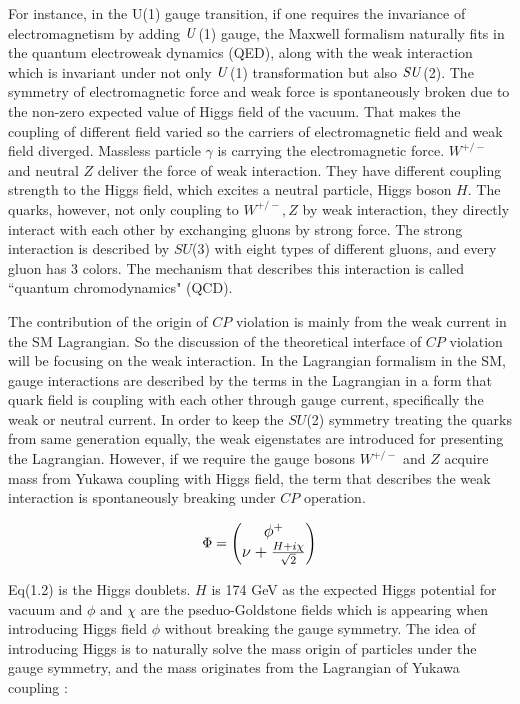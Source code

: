 For instance, in the U(1) gauge transition, if one requires the invariance of electromagnetism by adding $\it{U}$(1) gauge, the Maxwell formalism naturally fits in the quantum electroweak dynamics (QED), along with the weak interaction which is invariant under not only $\it{U}$(1) transformation but also $\it{SU}$(2). The symmetry of electromagnetic force and weak force is spontaneously broken due to the non-zero expected value of Higgs field of the vacuum. That makes the coupling of different field varied so the carriers of electromagnetic field and weak field diverged. Massless particle $\gamma$ is carrying the electromagnetic force. $W^{+/-}$ and neutral $Z$ deliver the force of weak interaction. They have different coupling strength to the Higgs field, which excites a neutral particle, Higgs boson $H$. The quarks, however, not only coupling to $W^{+/-},Z$ by weak interaction, they directly interact with each other by exchanging gluons by strong force. The strong interaction is described by $SU$(3) with eight types of different gluons, and every gluon has 3 colors. The mechanism that describes this interaction is called ``quantum chromodynamics" (QCD). 

The contribution of the origin of $CP$ violation is mainly from the weak current in the SM Lagrangian. So the discussion of the theoretical interface of $CP$ violation will be focusing on the weak interaction. In the Lagrangian formalism in the SM, gauge interactions are described by the terms in the Lagrangian in a form that quark field is coupling with each other through gauge current, specifically the weak or neutral current. In order to keep the $SU$(2) symmetry treating the quarks from same generation equally, the weak eigenstates are introduced for presenting the Lagrangian. However, if we require the gauge bosons $W^{+/-}$ and $Z$ acquire mass from Yukawa coupling with Higgs field, the term that describes the weak interaction is spontaneously breaking under $CP$ operation. 

\begin{equation}
\large
\Phi = 
\begin{pmatrix}
\phi^+\\
\nu + \frac{H+i\chi}{\sqrt{2}}
\end{pmatrix}
\end{equation}

Eq(1.2) is the Higgs doublets. $H$ is 174 GeV as the expected Higgs potential for vacuum and $\phi$ and $\chi$ are the pseduo-Goldstone fields which is appearing when introducing Higgs field  $\phi$ without breaking the gauge symmetry. The idea of introducing Higgs is to naturally solve the mass origin of particles under the gauge symmetry, and the mass originates from the Lagrangian of Yukawa coupling : 

